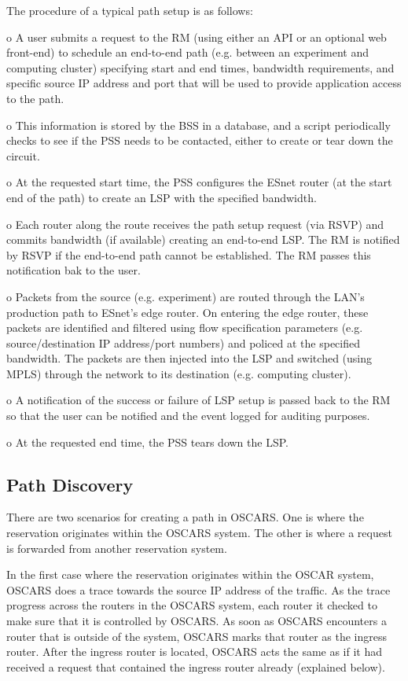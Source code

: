 \documentclass[conference]{IEEEtran}
\begin{document}
The procedure of a typical path setup is as follows:

o A user submits a request to the RM (using either an API or
an optional web front-end) to schedule an end-to-end path (e.g. between an
experiment and computing cluster) specifying start and end times, bandwidth
requirements, and specific source IP address and port that will be used to     
provide application access to the path.

o This information is stored by the BSS in a database, and a script 
periodically checks to see if the PSS needs to be contacted, either to create 
or tear down the circuit.

o At the requested start time, the PSS configures the ESnet router
(at the start end of the path) to create an LSP with the
specified bandwidth.

o Each router along the route receives the path setup request (via RSVP)
and commits bandwidth (if available) creating an end-to-end LSP.  The RM is
notified by RSVP if the end-to-end path cannot be established.  The RM
passes this notification bak to the user.

o Packets from the source (e.g. experiment) are routed through the
LAN's production path to ESnet's edge router.  On entering the edge router,
these packets are identified and filtered using flow specification parameters
(e.g. source/destination IP address/port numbers) and policed at the specified
bandwidth.  The packets are then injected into the LSP and switched (using MPLS)
through the network to its destination (e.g. computing cluster).

o A notification of the success or failure of LSP setup is 
passed back to the RM so that the user can be notified and the event 
logged for auditing purposes.

o At the requested end time, the PSS tears down the LSP.

\subsection{Path Discovery}
There are two scenarios for creating a path in OSCARS.  One is where the
reservation originates within the OSCARS system.  The other is where a request
is forwarded from another reservation system. 

In the first case where the reservation originates within the OSCAR system,
OSCARS does a trace towards the source IP address of the traffic. As the trace
progress across the routers in the OSCARS system, each router it checked to make
sure that it is controlled by OSCARS. As soon as OSCARS encounters a router that
is outside of the system, OSCARS marks that router as the ingress router. After
the ingress router is located, OSCARS acts the same as if it had received a
request that contained the ingress router already (explained below).
\end{document}
